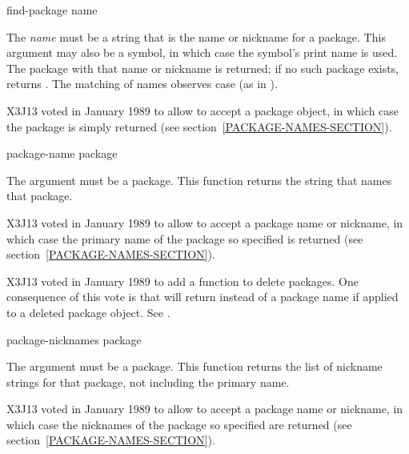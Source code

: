 \begin{defun}[Function]
find-package name

The {\it name} must be a string that is the name or nickname for a
package.  This argument may also be a symbol, in which case the symbol's
print name is used.  The package with that name or nickname
is returned; if no such package exists,  returns {\false}.
The matching of names observes case (as in ).

\begin{new}
X3J13 voted in January 1989
to allow  to accept a package object, in which case
the package is simply returned (see section~\ref{PACKAGE-NAMES-SECTION}).
\end{new}
\end{defun}

\begin{defun}[Function]
package-name package

The argument must be a package.  This function returns the string that
names that package.

\begin{new}
X3J13 voted in January 1989
to allow  to accept a package name or nickname, in which case
the primary name of the package so specified is returned
(see section~\ref{PACKAGE-NAMES-SECTION}).
\end{new}

\begin{new}
X3J13 voted in January 1989
to add a function to delete packages.
One consequence of this vote is that 
will return  instead of a package name if applied
to a deleted package object.  See .
\end{new}
\end{defun}

\begin{defun}[Function]
package-nicknames package

The argument must be a package.  This function returns the list of
nickname strings for that package, not including the primary name.

\begin{new}
X3J13 voted in January 1989
to allow  to accept a package name or nickname,
in which case the nicknames of the package so specified are returned
(see section~\ref{PACKAGE-NAMES-SECTION}).
\end{new}
\end{defun}

